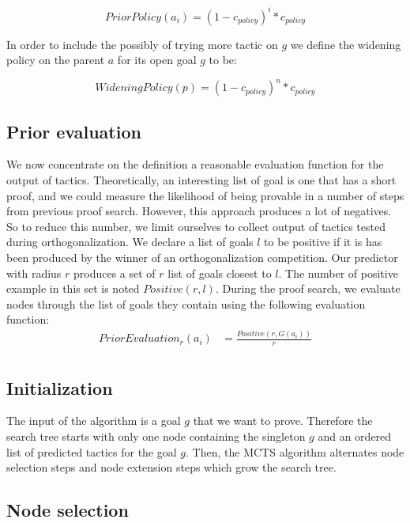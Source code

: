 \documentclass[runningheads,a4paper,draft]{svjour3}
\begin{document}
\[PriorPolicy(a_i) = (1 - c_{policy})^{i} * c_{policy}\]

In order to include the possibly of trying more tactic on $g$ we define the 
widening policy on the parent $a$ for its open goal $g$ to be:

\[WideningPolicy(p) = (1 - c_{policy})^{n} * c_{policy}\]


\subsection{Prior evaluation}\label{sec:evaluation}

We now concentrate on the definition a reasonable evaluation function for the 
output of tactics. Theoretically, an interesting list of goal is one 
that has a short proof, and we could measure the likelihood of being 
provable in a number of steps from previous proof search. However, this 
approach produces a lot of negatives. So to reduce this number, we limit 
ourselves to collect output of tactics tested during orthogonalization. We 
declare a list of goals $l$ to be positive if it is has been produced by the 
winner of an orthogonalization competition. Our predictor with radius $r$ 
produces a set of $r$ list of goals 
closest to $l$. The 
number of positive example in this set is noted $Positive(r,l)$.
During the proof search, we evaluate nodes through the list of goals they 
contain using the following evaluation function:
\begin{align*}
PriorEvaluation_r (a_i) &= \frac{Positive(r,G(a_i))}{r}\\
\end{align*}

\subsection{Initialization}
The input of the algorithm is a goal $g$ that we want to prove.
Therefore the search tree starts with only one node containing the singleton 
$g$ and an ordered list of predicted tactics for the goal $g$.
Then, the MCTS algorithm alternates node selection steps and node extension 
steps which grow the search tree.

\subsection{Node selection}

\end{document}
